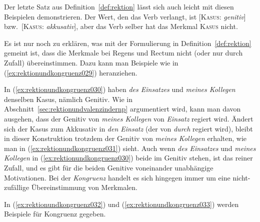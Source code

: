 Der letzte Satz aus Definition~\ref{def:rektion} lässt sich auch leicht mit diesen Beispielen demonstrieren.
Der Wert, den das Verb verlangt, ist [\textsc{Kasus}: \textit{genitiv}] bzw.\ [\textsc{Kasus}: \textit{akkusativ}], aber das Verb selber hat das Merkmal \textsc{Kasus} nicht.

Es ist nur noch zu erklären, was mit der Formulierung in Definition~\ref{def:rektion} gemeint ist, dass die Merkmale bei Regens und Rectum nicht (oder nur durch Zufall) übereinstimmen.
Dazu kann man Beispiele wie in (\ref{ex:rektionundkongruenz029}) heranziehen.

\begin{exe}
  \ex\label{ex:rektionundkongruenz029}
  \begin{xlist}
  \end{xlist}
\end{exe}

In (\ref{ex:rektionundkongruenz030}) haben \textit{des Einsatzes} und \textit{meines Kollegen} denselben Kasus, nämlich Genitiv.
Wie in Abschnitt~\ref{sec:rektionundvalenzindernp} argumentiert wird, kann man davon ausgehen, dass der Genitiv von \textit{meines Kollegen} von \textit{Einsatz} regiert wird.
Ändert sich der Kasus zum Akkusativ in \textit{den Einsatz} (der von \textit{durch} regiert wird), bleibt in dieser Konstruktion trotzdem der Genitiv von \textit{meines Kollegen} erhalten, wie man in (\ref{ex:rektionundkongruenz031}) sieht.
Auch wenn \textit{des Einsatzes} und \textit{meines Kollegen} in (\ref{ex:rektionundkongruenz030}) beide im Genitiv stehen, ist das reiner Zufall, und es gibt für die beiden Genitive voneinander unabhängige Motivationen.
Bei der \textit{Kongruenz} handelt es sich hingegen immer um eine nicht-zufällige Übereinstimmung von Merkmalen.


In (\ref{ex:rektionundkongruenz032}) und (\ref{ex:rektionundkongruenz033}) werden Beispiele für Kongruenz gegeben.

\begin{exe}
\end{exe}


